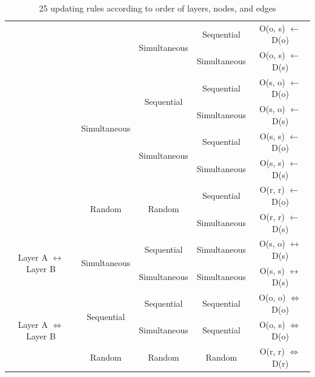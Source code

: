 \begin{table}[htp]
\begin{center}
\begin{tabular}{c|c|c|c|c}
			&                                & \multirow{2}{*}{Simultaneous}      & Sequential             & O(o, s) $\leftarrow$ D(o) \\  \cline{4-5} 
			&                                &                                    & Simultaneous           & O(o, s) $\leftarrow$ D(s) \\  \cline{2-5} 
			& \multirow{4}{*}{Simultaneous}  & \multirow{2}{*}{Sequential}        & Sequential             & O(s, o) $\leftarrow$ D(o) \\  \cline{4-5}
			&                                &                                    & Simultaneous           & O(s, o) $\leftarrow$ D(s) \\  \cline{3-5}
			&                                & \multirow{2}{*}{Simultaneous}      & Sequential             & O(s, s) $\leftarrow$ D(o) \\  \cline{4-5}
			&                                &                                    & Simultaneous           & O(s, s) $\leftarrow$ D(s) \\  \cline{2-5}
			& \multirow{2}{*}{Random}        & \multirow{2}{*}{Random}            & Sequential             & O(r, r) $\leftarrow$ D(o) \\  \cline{4-5}
			&                                &                                    & Simultaneous           & O(r, r) $\leftarrow$ D(s) \\   \hline
			\multirow{2}{*}{Layer A $\leftrightarrow$ Layer B}& \multirow{2}{*}{Simultaneous}& Sequential                         & Simultaneous           & O(s, o) $\leftrightarrow$ D(s) \\ \cline{3-5}
			&                                & Simultaneous                       & Simultaneous           & O(s, s) $\leftrightarrow$ D(s) \\ \hline
			\multirow{3}{*}{Layer A $\Leftrightarrow$ Layer B}& \multirow{2}{*}{Sequential}  & Sequential                         & Sequential             & O(o, o) $\Leftrightarrow$ D(o) \\ \cline{3-5}
			&                                & Simultaneous                       & Sequential             & O(o, s) $\Leftrightarrow$ D(o) \\ \cline{2-5}
			& Random                         & Random                             & Random                 & O(r, r) $\Leftrightarrow$ D(r) \\ \hline
			
		\end{tabular}
	\end{center}
	\caption{25 updating rules according to order of layers, nodes, and edges}
	\label{25updating_rules}
\end{table}
